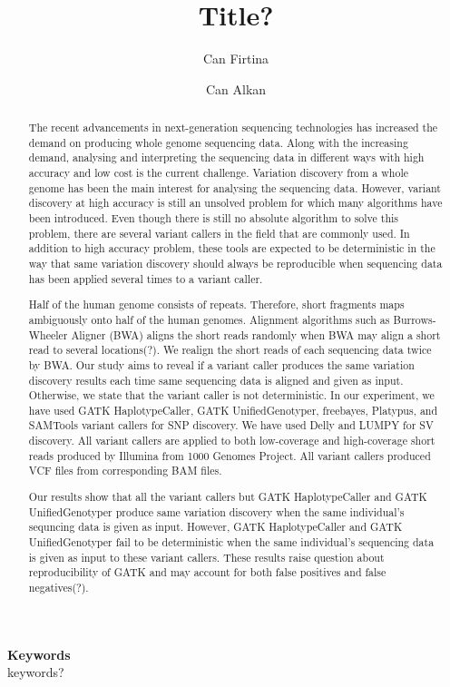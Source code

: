 \documentclass[a4paper]{article}
\date{}
\def\keywords#1{\begin{center}{\bf Keywords}\\{#1}\end{center}}
\def\titulo#1{\title{#1}}
\begin{document}
\titulo{Title?}

\author[1]{Can Firtina}
\author[1]{Can Alkan}

\maketitle
\thispagestyle{empty}


\begin{abstract}
The recent advancements in next-generation sequencing technologies has increased the demand on producing whole genome sequencing data. Along with the increasing demand, analysing and interpreting the sequencing data in different ways with high accuracy and low cost is the current challenge. Variation discovery from a whole genome has been the main interest for analysing the sequencing data. However, variant discovery at high accuracy is still an unsolved problem for which many algorithms have been introduced. Even though there is still no absolute algorithm to solve this problem, there are several variant callers in the field that are commonly used. In addition to high accuracy problem, these tools are expected to be deterministic in the way that same variation discovery should always be reproducible when sequencing data has been applied several times to a variant caller.

Half of the human genome consists of repeats. Therefore, short fragments maps ambiguously onto half of the human genomes. Alignment algorithms such as Burrows-Wheeler Aligner (BWA) aligns the short reads randomly when BWA may align a short read to several locations(?). We realign the short reads of each sequencing data twice by BWA. Our study aims to reveal if a variant caller produces the same variation discovery results each time same sequencing data is aligned and given as input. Otherwise, we state that the variant caller is not deterministic. In our experiment, we have used GATK HaplotypeCaller, GATK UnifiedGenotyper, freebayes, Platypus, and SAMTools variant callers for SNP discovery. We have used Delly and LUMPY for SV discovery. All variant callers are applied to both low-coverage and high-coverage short reads produced by Illumina from 1000 Genomes Project.  All variant callers produced VCF files from corresponding BAM files.

Our results show that all the variant callers but GATK HaplotypeCaller and GATK UnifiedGenotyper produce same variation discovery when the same individual's sequncing data is given as input. However, GATK HaplotypeCaller and GATK UnifiedGenotyper fail to be deterministic when the same individual's sequencing data is given as input to these variant callers. These results raise question about reproducibility of GATK and may account for both false positives and false negatives(?).
\end{abstract}

\keywords{keywords?} %
\end{document}
